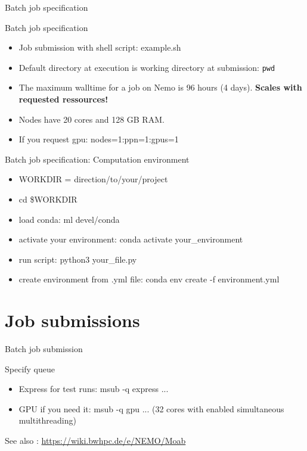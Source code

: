 \documentclass{beamer}
\begin{document}
\begin{frame}{Batch job specification}

\scalebox{0.5}{

}

\end{frame}


\begin{frame}{Batch job specification}


\begin{itemize}
    \item Job submission with shell script: example.sh
    \item Default directory at execution is working directory at submission: \texttt{pwd}
    \item The maximum walltime for a job on Nemo is 96 hours (4 days). \textbf{Scales with requested ressources!}
    \item Nodes have 20 cores and 128 GB RAM. 
    \item If you request gpu: nodes=1:ppn=1:gpus=1 	
\end{itemize}


\end{frame}


\begin{frame}{Batch job specification: Computation environment}

\begin{itemize}
    \item WORKDIR = direction/to/your/project
    \item cd \$WORKDIR
    \item load conda: ml devel/conda
    \item activate your environment: conda activate your\_environment
    \item run script: python3 your\_file.py
    \item create environment from .yml file: conda env create -f environment.yml
\end{itemize}


\end{frame}

\section{Job submissions}

\begin{frame}{Batch job submission}

Specify queue 
\begin{itemize}
    \item Express for test runs: msub -q express ...
    \item GPU if you need it: msub -q gpu ... (32 cores with enabled simultaneous multithreading) 
\end{itemize}

See also : \href{https://wiki.bwhpc.de/e/NEMO/Moab}{https://wiki.bwhpc.de/e/NEMO/Moab}




\end{frame}
\end{document}

